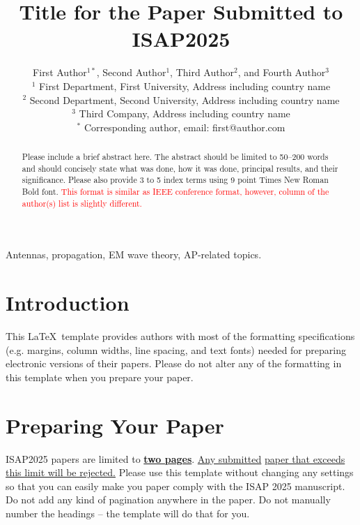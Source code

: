 \documentclass[conference,a4paper]{isap2025}
\title{
Title for the Paper Submitted to ISAP2025
}
\author{
First Author$^{1*}$, Second Author$^1$, Third Author$^2$, and Fourth Author$^3$
\\
$^1$ First Department, First University, Address including country name
\\
$^2$ Second Department, Second University, Address including country name
\\
$^3$ Third Company, Address including country name
\\
$^*$ Corresponding author, email: first@author.com
}
\begin{document}
\baselineskip 4.5mm

\maketitle

\begin{abstract}
Please include a brief abstract here. The abstract should be limited to 50--200 words and should concisely state what was done, how it was done, principal results, and their significance. Please also provide 3 to 5 index terms using 9 point Times New Roman Bold font. 
\textcolor{red}{
This format is similar as IEEE conference format, however, column of the author(s) list is slightly different. 
}
\end{abstract}

\begin{IEEEkeywords}
Antennas, propagation, EM wave theory, AP-related topics.
\end{IEEEkeywords}


\section{Introduction}

This \LaTeX \ template provides authors with most of the formatting specifications (e.g. margins, column widths, line spacing, and text fonts) needed for preparing electronic versions of their papers. Please do not alter any of the formatting in this template when you prepare your paper.


\section{Preparing Your Paper}

ISAP2025 papers are limited to \underline{\bf two pages}. 
\underline{Any submitted}
\underline{paper that exceeds this limit will be rejected.}  
Please use this template without changing any settings so that you can easily make you paper comply with the ISAP 2025 manuscript. Do not add any kind of pagination anywhere in the paper. Do not manually number the headings -- the template will do that for you.
\end{document}
